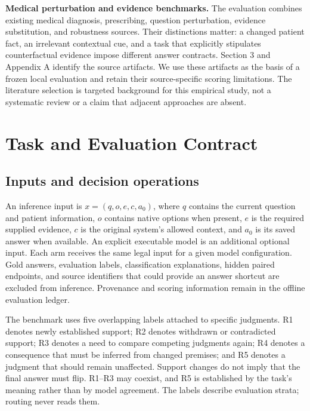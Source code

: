 \documentclass[
  english,
  11pt,
]{article}
\begin{document}
\textbf{Medical perturbation and evidence benchmarks.} The evaluation
combines existing medical diagnosis, prescribing, question perturbation,
evidence substitution, and robustness sources. Their distinctions
matter: a changed patient fact, an irrelevant contextual cue, and a task
that explicitly stipulates counterfactual evidence impose different
answer contracts. Section 3 and Appendix A identify the source
artifacts. We use these artifacts as the basis of a frozen local
evaluation and retain their source-specific scoring limitations. The
literature selection is targeted background for this empirical study,
not a systematic review or a claim that adjacent approaches are absent.

\section{Task and Evaluation
Contract}\label{task-and-evaluation-contract}

\subsection{Inputs and decision
operations}\label{inputs-and-decision-operations}

An inference input is \(x=(q,o,e,c,a_0)\), where \(q\) contains the
current question and patient information, \(o\) contains native options
when present, \(e\) is the required supplied evidence, \(c\) is the
original system's allowed context, and \(a_0\) is its saved answer when
available. An explicit executable model is an additional optional input.
Each arm receives the same legal input for a given model configuration.
Gold answers, evaluation labels, classification explanations, hidden
paired endpoints, and source identifiers that could provide an answer
shortcut are excluded from inference. Provenance and scoring information
remain in the offline evaluation ledger.

The benchmark uses five overlapping labels attached to specific
judgments. R1 denotes newly established support; R2 denotes withdrawn or
contradicted support; R3 denotes a need to compare competing judgments
again; R4 denotes a consequence that must be inferred from changed
premises; and R5 denotes a judgment that should remain unaffected.
Support changes do not imply that the final answer must flip. R1--R3 may
coexist, and R5 is established by the task's meaning rather than by
model agreement. The labels describe evaluation strata; routing never
reads them.
\end{document}
